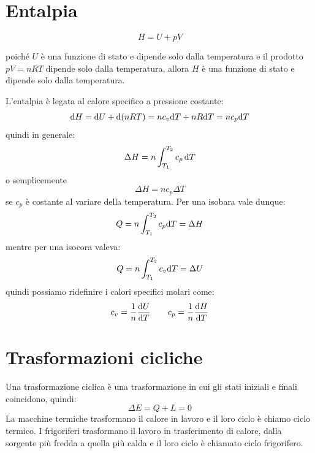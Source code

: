 \section{Entalpia}
\begin{Def}[Entalpia]
   \begin{equation}
      H = U + pV
   \end{equation}
\end{Def}
poiché $U$ è una funzione di stato e dipende solo dalla temperatura e il prodotto $pV=nRT$ dipende solo dalla temperatura, allora $H$ è una funzione di stato e dipende solo dalla temperatura.

L'entalpia è legata al calore specifico a pressione costante:
\begin{equation}
   \mathrm{d} H = \mathrm{d} U + \mathrm{d}(nRT) = nc_v\mathrm{d} T + nR\mathrm{d} T = nc_p\mathrm{d} T
\end{equation}
quindi in generale:
\begin{equation}
   \Delta H = n\int_{T_1}^{T_2} c_p\,\mathrm{d} T
\end{equation}
o semplicemente
\begin{equation}
   \Delta H = nc_p\Delta T
\end{equation}
se $c_p$ è costante al variare della temperatura. Per una isobara vale dunque:
\begin{equation*}
   Q = n\int_{T_1}^{T_2} c_p\mathrm{d} T = \Delta H
\end{equation*}
mentre per una isocora valeva:
\begin{equation*}
   Q = n\int_{T_1}^{T_2}c_v\mathrm{d} T = \Delta U
\end{equation*}
quindi possiamo ridefinire i calori specifici molari come:
\begin{equation}
   c_v = \frac{1}{n}\frac{\mathrm{d} U}{\mathrm{d} T} \qquad c_p = \frac{1}{n}\frac{\mathrm{d} H}{\mathrm{d} T}
\end{equation}


\section{Trasformazioni cicliche}
Una trasformazione ciclica è una trasformazione in cui gli stati iniziali e finali coincidono, quindi:
\begin{equation}
   \Delta E=Q+L=0
\end{equation}
La macchine termiche trasformano il calore in lavoro e il loro ciclo è chiamo ciclo termico. I frigoriferi trasformano il lavoro in trasferimento di calore, dalla sorgente più fredda a quella più calda e il loro ciclo è chiamato ciclo frigorifero.
